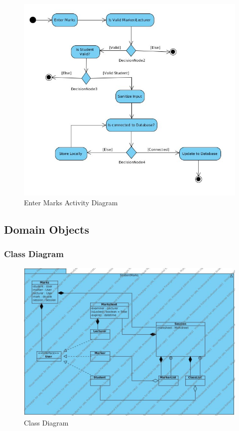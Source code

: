 \documentclass[a4paper]{article}
\begin{document}
			\begin{figure}[H]
				\centering
				\includegraphics[width=1\textwidth]{EnterMarksActivityDiagram}
				\caption{Enter Marks Activity Diagram}
			\end{figure}

		\subsection{Domain Objects}
		
			\subsubsection{Class Diagram}
			
			\begin{figure}[h]
				\caption{Class Diagram}
				\includegraphics[width=1\textwidth]{StudentMarksClassDiagram}
			\end{figure}
\end{document}
